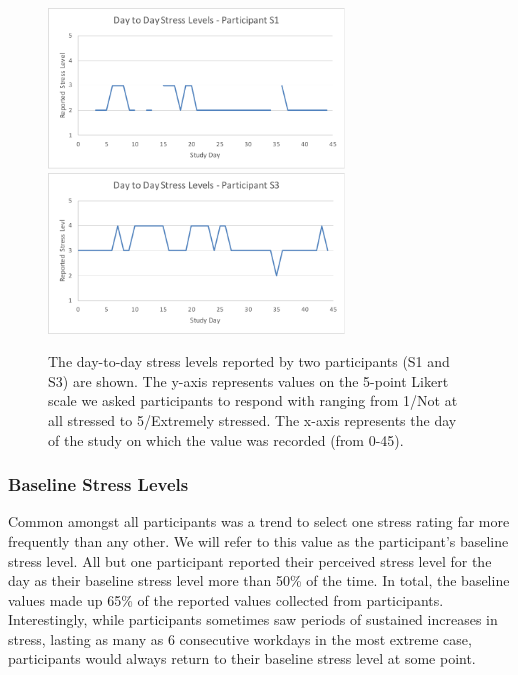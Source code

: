 \begin{figure}[h!]
  \centering
      \includegraphics[width=0.7\textwidth]{s1_stress.pdf}
      \includegraphics[width=0.7\textwidth]{s3_stress.pdf}
  \caption{The day-to-day stress levels reported by two participants (S1 and S3) are shown. The y-axis represents values on the 5-point Likert scale we asked participants to respond with ranging from 1/Not at all stressed to 5/Extremely stressed. The x-axis represents the day of the study on which the value was recorded (from 0-45). }
   \vspace*{-2mm}
   \label{fig:dailyStress}
\end{figure}

\subsubsection{Baseline Stress Levels}
Common amongst all participants was a trend to select one stress rating
far more frequently than any other. We will refer to this value as the
participant's baseline stress level. All but one participant reported
their perceived stress level for the day as their baseline stress
level more than 50\% of the time. In total, the baseline values made
up 65\% of the reported values collected from
participants. Interestingly, while participants sometimes saw periods
of sustained increases in stress, lasting as many as 6 consecutive
workdays in the most extreme case, participants would always return to
their baseline stress level at some point.



